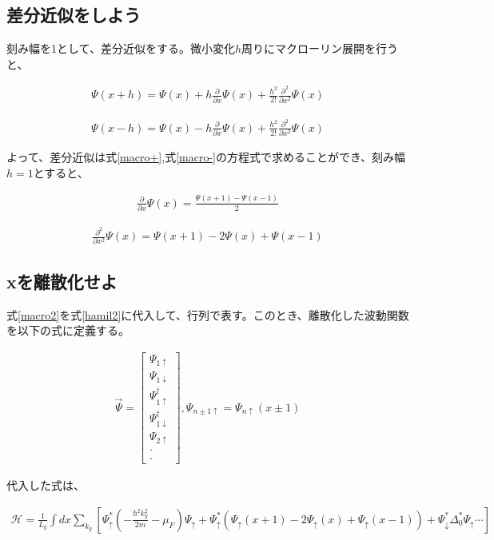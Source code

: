 \documentclass{jsarticle}
\begin{document}
		\subsection{差分近似をしよう}
		刻み幅を1として、差分近似をする。微小変化$h$周りにマクローリン展開を行うと、

		\begin{align}
			\Psi\left(x+h\right)=\Psi\left(x\right)+h\frac{\partial}{\partial x}\Psi\left(x\right)+\frac{h^2}{2!}\frac{\partial^2}{\partial x^2}\Psi\left(x\right)
			\label{macro+}
		\end{align}

		\begin{align}
			\Psi\left(x-h\right)=\Psi\left(x\right)-h\frac{\partial}{\partial x}\Psi\left(x\right)+\frac{h^2}{2!}\frac{\partial^2}{\partial x^2}\Psi\left(x\right)
			\label{macro-}
		\end{align}

		よって、差分近似は式\eqref{macro+},式\eqref{macro-}の方程式で求めることができ、刻み幅$h=1$とすると、

		\begin{align}
			\frac{\partial}{\partial x}\Psi\left(x\right)=
			\frac{\Psi\left(x+1\right)-\Psi\left(x-1\right)}{2}
		\end{align}

		\begin{align}
			\frac{\partial^2}{\partial x^2}\Psi\left(x\right)=
			\Psi\left(x+1\right)-2\Psi\left(x\right)+\Psi\left(x-1\right)
			\label{macro2}
		\end{align}

		\subsection{xを離散化せよ}
		式\eqref{macro2}を式\eqref{hamil2}に代入して、行列で表す。このとき、離散化した波動関数を以下の式に定義する。

		\begin{align}
			\vec{\Psi}=
			\begin{bmatrix}
				\Psi_{1\uparrow} \\
				\Psi_{1\downarrow} \\
				\Psi_{1\uparrow}^\dagger \\
				\Psi_{1\downarrow}^\dagger \\
				\Psi_{2\uparrow} \\
				\cdot \\
				\cdot
			\end{bmatrix},
			\Psi_{n\pm 1\uparrow}=\Psi_{n\uparrow}\left(x\pm 1\right)
		\end{align}

		代入した式は、

		\begin{align}
			\mathcal{H}= \frac{1}{L_y}\int dx \sum_{k_y}
			\left[ \Psi^\ast_\uparrow \left( -\frac{\hbar^2k_y^2}{2m}-\mu_F \right)\Psi_\uparrow
			+\Psi^\ast_\uparrow \left( \Psi_\uparrow\left(x+1\right)-2\Psi_\uparrow\left(x\right)+\Psi_\uparrow\left(x-1\right)
			\right)+\Psi^\ast_\downarrow \Delta_0^\ast \Psi_\uparrow \cdots
			\right]
			\label{hamil3}
		\end{align}
\end{document}
